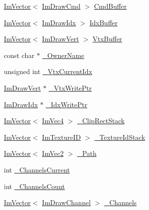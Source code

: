 \begin{DoxyCompactItemize}
\item 
\mbox{\hyperlink{class_im_vector}{Im\+Vector}}$<$ \mbox{\hyperlink{struct_im_draw_cmd}{Im\+Draw\+Cmd}} $>$ \mbox{\hyperlink{struct_im_draw_list_a67a4b5cc4c83bc3b81d96c46cbd38a07}{Cmd\+Buffer}}
\item 
\mbox{\hyperlink{class_im_vector}{Im\+Vector}}$<$ \mbox{\hyperlink{imgui_8h_afdc8744a5ac1a968b1ddfa47e13b2fa1}{Im\+Draw\+Idx}} $>$ \mbox{\hyperlink{struct_im_draw_list_adf292ff70a954d82daf061c609e75dfc}{Idx\+Buffer}}
\item 
\mbox{\hyperlink{class_im_vector}{Im\+Vector}}$<$ \mbox{\hyperlink{struct_im_draw_vert}{Im\+Draw\+Vert}} $>$ \mbox{\hyperlink{struct_im_draw_list_aa8ff4aee39cf3c3791b7e29a7b4264be}{Vtx\+Buffer}}
\item 
const char $\ast$ \mbox{\hyperlink{struct_im_draw_list_a643f385fb9d5fc35a431e72a10a212f5}{\+\_\+\+Owner\+Name}}
\item 
unsigned int \mbox{\hyperlink{struct_im_draw_list_a2228793183665bc3d8612795555fe505}{\+\_\+\+Vtx\+Current\+Idx}}
\item 
\mbox{\hyperlink{struct_im_draw_vert}{Im\+Draw\+Vert}} $\ast$ \mbox{\hyperlink{struct_im_draw_list_a67f870f5140bf1cab14b8515b7386073}{\+\_\+\+Vtx\+Write\+Ptr}}
\item 
\mbox{\hyperlink{imgui_8h_afdc8744a5ac1a968b1ddfa47e13b2fa1}{Im\+Draw\+Idx}} $\ast$ \mbox{\hyperlink{struct_im_draw_list_a771f4c7f71873852fe030c3e498e5843}{\+\_\+\+Idx\+Write\+Ptr}}
\item 
\mbox{\hyperlink{class_im_vector}{Im\+Vector}}$<$ \mbox{\hyperlink{struct_im_vec4}{Im\+Vec4}} $>$ \mbox{\hyperlink{struct_im_draw_list_ae950024f053f3c94dc2c763d20be609d}{\+\_\+\+Clip\+Rect\+Stack}}
\item 
\mbox{\hyperlink{class_im_vector}{Im\+Vector}}$<$ \mbox{\hyperlink{imgui_8h_a364f4447ecbc4ca176145ccff9db6286}{Im\+Texture\+ID}} $>$ \mbox{\hyperlink{struct_im_draw_list_a848faddd121da050214b8d8159e5e704}{\+\_\+\+Texture\+Id\+Stack}}
\item 
\mbox{\hyperlink{class_im_vector}{Im\+Vector}}$<$ \mbox{\hyperlink{struct_im_vec2}{Im\+Vec2}} $>$ \mbox{\hyperlink{struct_im_draw_list_a5bdc39abf351360500048628b8dc1b07}{\+\_\+\+Path}}
\item 
int \mbox{\hyperlink{struct_im_draw_list_a143ff30108f3dca8c28c7925e23d358b}{\+\_\+\+Channels\+Current}}
\item 
int \mbox{\hyperlink{struct_im_draw_list_ae3854c12dbac41400f4acb65192f5015}{\+\_\+\+Channels\+Count}}
\item 
\mbox{\hyperlink{class_im_vector}{Im\+Vector}}$<$ \mbox{\hyperlink{struct_im_draw_channel}{Im\+Draw\+Channel}} $>$ \mbox{\hyperlink{struct_im_draw_list_ae6be941728e5b2c81a03c78e4aa22629}{\+\_\+\+Channels}}
\end{DoxyCompactItemize}


